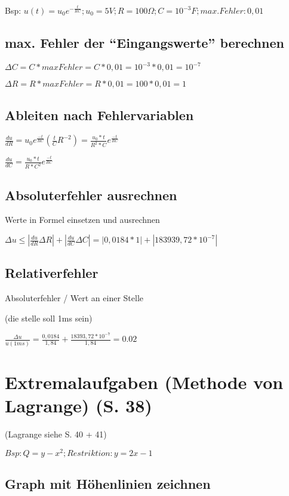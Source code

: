 \documentclass[a4paper, 11pt]{article}
\begin{document}
Bsp: $u(t) = u_0 e^{- \frac{t}{R C}}; u_0 = 5V; R = 100 \Omega; C =
10^{-3}F; max. Fehler: 0,01 $
\subsection { max. Fehler der ``Eingangswerte'' berechnen }

$ \Delta C = C * maxFehler = C * 0,01 = 10^{-3} * 0,01 = 10^{-7} $

$ \Delta R = R * maxFehler = R * 0,01 = 100 * 0,01 = 1 $

\subsection { Ableiten nach Fehlervariablen}

$\frac {du} {dR} = u_0 e^{\frac{-t}{RC}} (\frac{t}{C}R^{-2}) = \frac{u_0 *
t}{R^2 * C} e^{\frac{-t}{RC}}$

$\frac {du} {dC} = \frac{u_0 *
t}{R * C^2} e^{\frac{-t}{RC}}$

\subsection { Absoluterfehler ausrechnen}

Werte in Formel einsetzen und ausrechnen

$\Delta u \leq |\frac {du} {dR} \Delta R |+| \frac {du} {dC} \Delta C| = |
0,0184 * 1 |+| 183939,72 * 10^{-7}|$

\subsection { Relativerfehler}

Absoluterfehler / Wert an einer Stelle

(die stelle soll 1ms sein)

$\frac{\Delta u}{u(1ms)} = \frac {0,0184} {1,84} + \frac {18393,72* 10^{-7}}
{1,84} = 0.02 $

\section{Extremalaufgaben (Methode von Lagrange) (S. 38)}
(Lagrange siehe S. 40 + 41)

$Bsp: Q = y - x^2; Restriktion: y = 2x - 1 $

\subsection{Graph mit Höhenlinien zeichnen}
\end{document}
